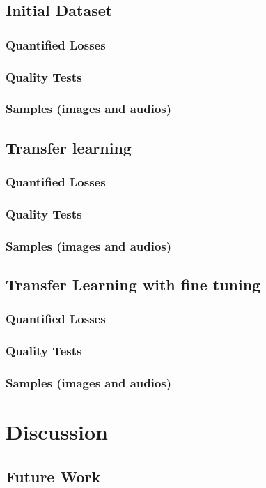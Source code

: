 \documentclass{book}
\begin{document}
\section{Initial Dataset}
\subsection{Quantified Losses}
\subsection{Quality Tests}
\subsection{Samples (images and audios)}
\section{Transfer learning}
\subsection{Quantified Losses}
\subsection{Quality Tests}
\subsection{Samples (images and audios)}
\section{Transfer Learning with fine tuning}
\subsection{Quantified Losses}
\subsection{Quality Tests}
\subsection{Samples (images and audios)}

\chapter{Discussion}
\section{Future Work}
\end{document}
